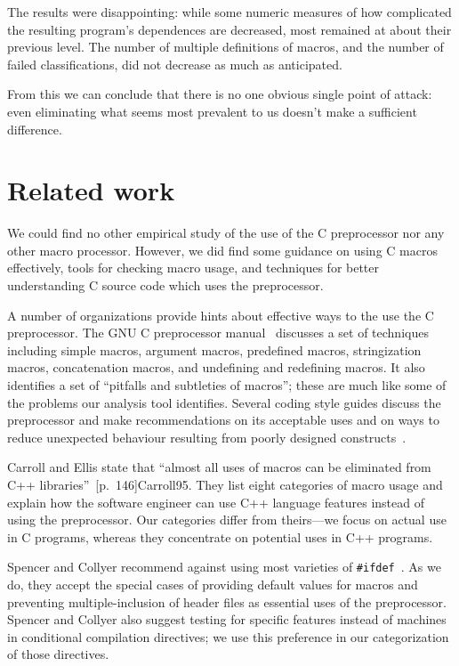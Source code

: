 \documentclass[10pt]{article}
\begin{document}
    The results were disappointing:  while some numeric measures of how
      complicated the resulting program's dependences are decreased, most
      remained at about their previous level.  The number of multiple
      definitions of macros, and the number of failed classifications, did
      not decrease as much as anticipated.

    From this we can conclude that there is no one obvious single point of
      attack:  even eliminating what seems most prevalent to us doesn't
      make a sufficient difference.



\section{Related work}
\label{sec:related}


We could find no other empirical study of the use of the C
preprocessor nor any other macro processor.  However, we did find some
guidance on using C macros effectively, tools for checking macro
usage, and techniques for better understanding C source code which uses the
preprocessor.

A number of organizations provide hints about effective ways to the use
the C preprocessor.  The GNU C preprocessor manual~\cite{cpp-manual}
discusses a set of techniques including simple macros, argument macros,
predefined macros, stringization macros, concatenation macros, and
undefining and redefining macros.  It also identifies a set of
``pitfalls and subtleties of macros''; these are much like some of the
problems our analysis tool identifies.  Several coding style guides
discuss the preprocessor and make recommendations on its acceptable uses
and on ways to reduce unexpected behaviour resulting from poorly
designed constructs~\cite{Stallman97,ellemtel92,Cannon95,Dolenc90}.

Carroll and Ellis state that ``almost all uses of macros can be
eliminated from C++ libraries''~[p.~146]{Carroll95}.  They list eight
categories of macro usage and explain how the software engineer can use
C++ language features instead of using the preprocessor.  Our categories
differ from theirs---we focus on actual use in C programs, whereas they
concentrate on potential uses in C++ programs.

Spencer and Collyer recommend against using most varieties of
\texttt{\#ifdef}~\cite{SpencerC92}.  As we do, they accept the special
cases of providing default values for macros and preventing
multiple-inclusion of header files as essential uses of the
preprocessor.  Spencer and Collyer also suggest testing for specific
features instead of machines in conditional compilation directives; we
use this preference in our categorization of those directives.
\end{document}
